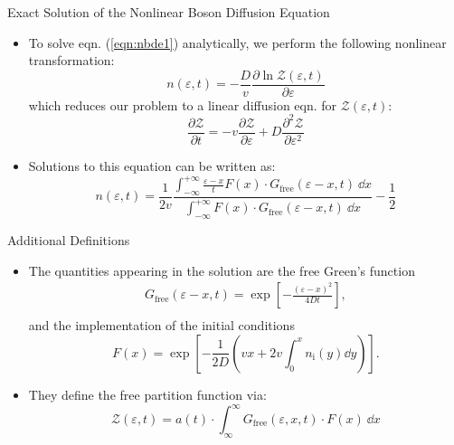 \begin{frame}{Exact Solution of the Nonlinear Boson Diffusion Equation} 
\begin{itemize}
	\item To solve eqn. (\ref{eqn:nbde1}) analytically, we perform the following \alert{nonlinear transformation:}
	\begin{equation}
		n(\varepsilon,t) = -\frac{D}{v}\frac{\partial \ln \mathcal{Z}(\varepsilon,t)}{\partial\varepsilon}
	\end{equation}
	which reduces our problem to a \alert{linear diffusion eqn.} for $ \mathcal{Z}(\varepsilon,t)$:
	\begin{equation}
		\frac{\partial  \mathcal{Z}}{\partial t} = -v\frac{\partial  \mathcal{Z}}{\partial \varepsilon} +  D\frac{\partial^2  \mathcal{Z}}{\partial \varepsilon^2}
	\end{equation}
	\item Solutions to this equation can be written as:
 \begin{equation}
n(\varepsilon, t)=\frac{1}{2 v} \frac{\int_{-\infty}^{+\infty} \frac{\varepsilon-x}{t} F(x)\cdot G_{\mathrm{free}}(\varepsilon-x,t)\ \dd x}{\int_{-\infty}^{+\infty} F(x)\cdot G_{\mathrm{free}}(\varepsilon-x,t)\ \dd x}-\frac{1}{2}
\end{equation}
\end{itemize}
\end{frame}

\begin{frame}{Additional Definitions} 
\begin{itemize}
\item The quantities appearing in the solution are the \alert{free Green's function}
\begin{align}
	G_{\mathrm{free}}(\varepsilon-x,t) = \exp\left[-\frac{(\varepsilon-x)^2}{4Dt}\right],\\
\end{align}
and the implementation of the \alert{initial conditions}
\begin{equation}
	    F(x)  = \exp\left[-\frac{1}{2D}(vx+2v\int_0^x n_{\mathrm{i}}(y) \dd y) \right].
\end{equation}
\item They define the \alert{free partition function} via: 
\begin{equation}
	\mathcal{Z}(\varepsilon,t) = a(t)\cdot\int_{\infty}^{\infty} G_{\mathrm{free}}(\varepsilon,x,t)\cdot F(x)\ \dd x
\end{equation}
\end{itemize}
\end{frame}


